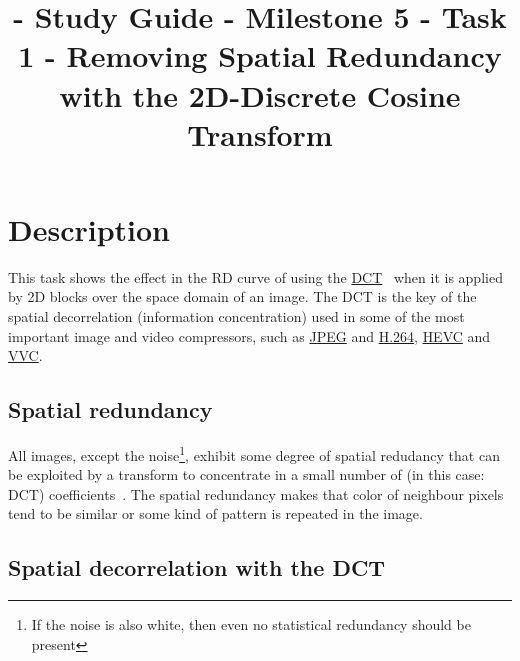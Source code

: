 

\title{\SM{} - Study Guide - Milestone 5 - Task 1 - Removing Spatial Redundancy with the 2D-Discrete Cosine Transform}

\maketitle

\tableofcontents

\section{Description}

This task shows the effect in the RD curve of using the
\href{https://en.wikipedia.org/wiki/Discrete_cosine_transform}{DCT}~\cite{vruiz__DCT}
when it is applied by 2D blocks over the space domain of an image. The
DCT is the key of the spatial decorrelation (information
concentration) used in some of the most important image and video
compressors, such as \href{https://en.wikipedia.org/wiki/JPEG}{JPEG}
and \href{https://en.wikipedia.org/wiki/Advanced_Video_Coding}{H.264},
\href{https://en.wikipedia.org/wiki/Advanced_Video_Coding}{HEVC} and
\href{https://en.wikipedia.org/wiki/Versatile_Video_Coding}{VVC}.

\subsection{Spatial redundancy}

All images, except the noise\footnote{If the noise is also white, then
even no statistical redundancy should be present}, exhibit some degree
of spatial redudancy that can be exploited by a transform to
concentrate in a small number of (in this case: DCT)
coefficients~\cite{vruiz__DCT}. The spatial redundancy makes that
color of neighbour pixels tend to be similar or some kind of pattern
is repeated in the image.

\subsection{Spatial decorrelation with the DCT}

